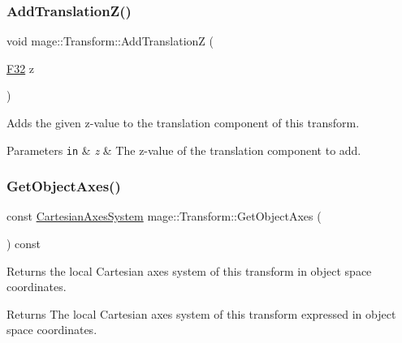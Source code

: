 \subsubsection{\texorpdfstring{Add\+Translation\+Z()}{AddTranslationZ()}}
{\footnotesize\ttfamily void mage\+::\+Transform\+::\+Add\+TranslationZ (\begin{DoxyParamCaption}\item[{\hyperlink{namespacemage_aa97e833b45f06d60a0a9c4fc22ae02c0}{F32}}]{z }\end{DoxyParamCaption})\hspace{0.3cm}{\ttfamily [noexcept]}}

Adds the given z-\/value to the translation component of this transform.


\begin{DoxyParams}[1]{Parameters}
\mbox{\tt in}  & {\em z} & The z-\/value of the translation component to add. \\
\hline
\end{DoxyParams}
\hypertarget{classmage_1_1_transform_a71f590385c153fd0a9dd15af4b8a4bc7}{}\label{classmage_1_1_transform_a71f590385c153fd0a9dd15af4b8a4bc7} 
\subsubsection{\texorpdfstring{Get\+Object\+Axes()}{GetObjectAxes()}}
{\footnotesize\ttfamily const \hyperlink{structmage_1_1_cartesian_axes_system}{Cartesian\+Axes\+System} mage\+::\+Transform\+::\+Get\+Object\+Axes (\begin{DoxyParamCaption}{ }\end{DoxyParamCaption}) const\hspace{0.3cm}{\ttfamily [noexcept]}}

Returns the local Cartesian axes system of this transform in object space coordinates.

\begin{DoxyReturn}{Returns}
The local Cartesian axes system of this transform expressed in object space coordinates. 
\end{DoxyReturn}
\hypertarget{classmage_1_1_transform_a9f1bb95655238cd91ceae487d49ae6c2}{}\label{classmage_1_1_transform_a9f1bb95655238cd91ceae487d49ae6c2} 
